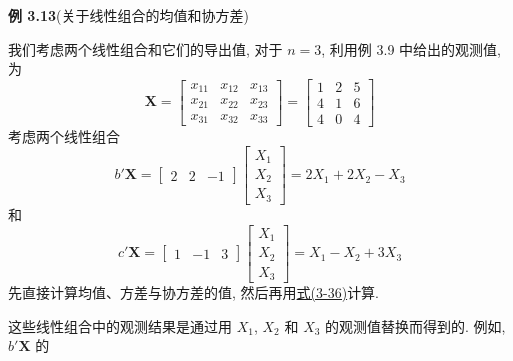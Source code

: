 \noindent\textbf{例 3.13}\quad (关于线性组合的均值和协方差)

我们考虑两个线性组合和它们的导出值, 对于 $n=3$, 利用例 3.9 中给出的观测值, 为
\[
\mathbf{X}=\begin{bmatrix}
x_{11}&x_{12}&x_{13}\\
x_{21}&x_{22}&x_{23}\\
x_{31}&x_{32}&x_{33}
\end{bmatrix}
=\begin{bmatrix}
1&2&5\\
4&1&6\\
4&0&4
\end{bmatrix}
\]
考虑两个线性组合
\[
b'\mathbf{X}=\begin{bmatrix}2&2&-1\end{bmatrix}
\begin{bmatrix}X_1\\X_2\\X_3\end{bmatrix}
=2X_1+2X_2-X_3
\]
和
\[
c'\mathbf{X}=\begin{bmatrix}1&-1&3\end{bmatrix}
\begin{bmatrix}X_1\\X_2\\X_3\end{bmatrix}
=X_1-X_2+3X_3
\]
先直接计算均值、方差与协方差的值, 然后再用\hyperref[eq:3-36]{式(3-36)}计算.

这些线性组合中的观测结果是通过用 $X_1$, $X_2$ 和 $X_3$ 的观测值替换而得到的. 例如, $b'\mathbf{X}$ 的
